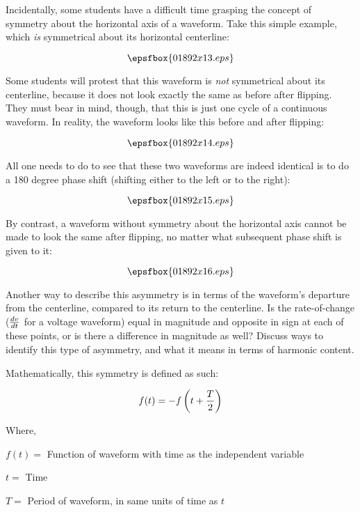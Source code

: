 Incidentally, some students have a difficult time grasping the concept of symmetry about the horizontal axis of a waveform.  Take this simple example, which {\it is} symmetrical about its horizontal centerline:

$$\epsfbox{01892x13.eps}$$

Some students will protest that this waveform is {\it not} symmetrical about its centerline, because it does not look exactly the same as before after flipping.  They must bear in mind, though, that this is just one cycle of a continuous waveform.  In reality, the waveform looks like this before and after flipping:

$$\epsfbox{01892x14.eps}$$

All one needs to do to see that these two waveforms are indeed identical is to do a 180 degree phase shift (shifting either to the left or to the right):

$$\epsfbox{01892x15.eps}$$

By contrast, a waveform without symmetry about the horizontal axis cannot be made to look the same after flipping, no matter what subsequent phase shift is given to it:

$$\epsfbox{01892x16.eps}$$

Another way to describe this asymmetry is in terms of the waveform's departure from the centerline, compared to its return to the centerline.  Is the rate-of-change ($dv \over dt$ for a voltage waveform) equal in magnitude and opposite in sign at each of these points, or is there a difference in magnitude as well?  Discuss ways to identify this type of asymmetry, and what it means in terms of harmonic content.

Mathematically, this symmetry is defined as such:

$$f(t) = -f \left(t + {T \over 2} \right)$$

\noindent
Where,

$f(t) = $ Function of waveform with time as the independent variable

$t = $ Time

$T = $ Period of waveform, in same units of time as $t$




